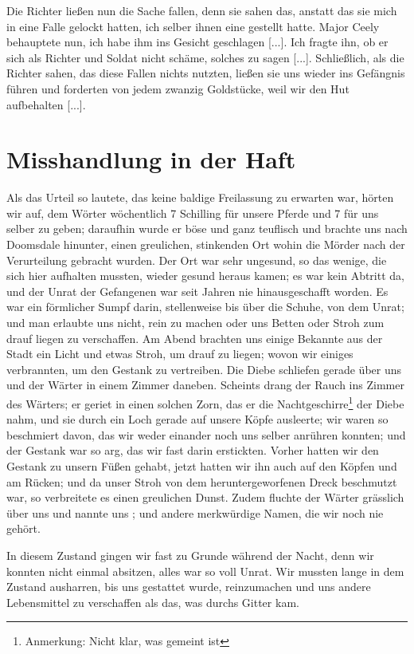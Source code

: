 Die Richter ließen nun die Sache fallen,
denn sie sahen das, anstatt das sie mich in eine Falle gelockt hatten,
ich selber ihnen eine gestellt hatte. Major Ceely behauptete nun,
ich habe ihm ins Gesicht geschlagen [...]. Ich fragte ihn, ob er
sich als Richter und Soldat nicht schäme, solches zu sagen [...].
Schließlich, als die Richter sahen, das diese Fallen nichts nutzten,
ließen sie uns wieder ins Gefängnis führen und forderten von
jedem zwanzig Goldstücke, weil wir den Hut aufbehalten [...].

\section{Misshandlung in der Haft}

Als das Urteil so lautete, das keine baldige Freilassung
zu erwarten war, hörten wir auf, dem Wörter wöchentlich
7 Schilling für unsere Pferde und 7 für uns selber zu geben;
daraufhin wurde er böse und ganz teuflisch und brachte uns nach
Doomsdale hinunter, einen greulichen, stinkenden 
Ort wohin die
Mörder nach der Verurteilung gebracht wurden. Der Ort war
sehr ungesund, so das wenige, die sich hier aufhalten mussten,
wieder gesund heraus kamen; es war kein Abtritt da, und der
Unrat der Gefangenen war seit Jahren nie hinausgeschafft worden.
Es war ein förmlicher Sumpf darin, stellenweise bis über die
Schuhe, von dem Unrat; und man erlaubte uns nicht, rein zu
machen oder uns Betten oder Stroh zum drauf liegen zu 
verschaffen. Am Abend brachten uns einige Bekannte aus der Stadt
ein Licht und etwas Stroh, um drauf zu liegen; wovon wir einiges
verbrannten, um den Gestank zu vertreiben. Die Diebe schliefen
gerade über uns und der Wärter in einem Zimmer daneben.
Scheints drang der Rauch ins Zimmer des Wärters; er geriet
in einen solchen Zorn, das er die 
Nachtgeschirre\footnote{Anmerkung: Nicht klar, was gemeint 
ist} der Diebe nahm,
und sie durch ein Loch gerade auf unsere Köpfe ausleerte; wir
waren so beschmiert davon, das wir weder einander noch uns selber
anrühren konnten; und der Gestank war so arg, das wir fast
darin erstickten. Vorher hatten wir den Gestank zu unsern Füßen
gehabt, jetzt hatten wir ihn auch auf den Köpfen und am Rücken;
und da unser Stroh von dem heruntergeworfenen Dreck beschmutzt
war, so verbreitete es einen greulichen Dunst. Zudem fluchte der
Wärter grässlich über uns und nannte uns ; und andere merkwürdige Namen, die wir noch nie gehört. 

In
diesem Zustand gingen wir fast zu Grunde während der Nacht,
denn wir konnten nicht einmal absitzen, alles war so voll Unrat.
Wir mussten lange in dem Zustand ausharren, bis uns gestattet
wurde, reinzumachen und uns andere Lebensmittel zu verschaffen als
das, was durchs Gitter kam. 


